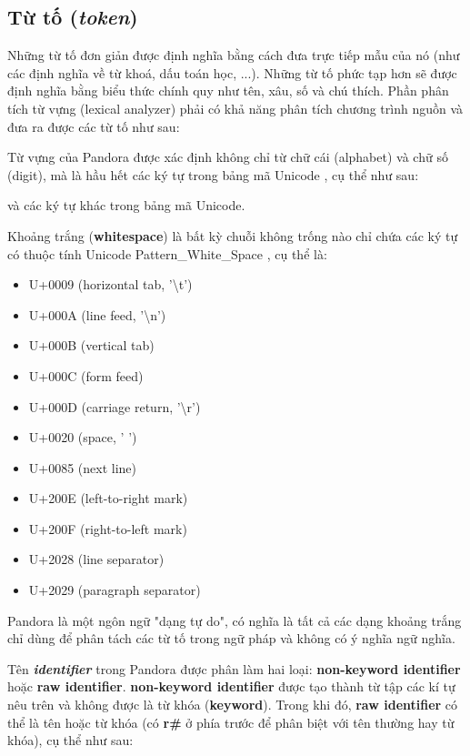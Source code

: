 \subsection{Từ tố (\textit{token})}
    Những từ tố đơn giản được định nghĩa bằng cách đưa trực tiếp mẫu của nó (như các định nghĩa về từ khoá, dấu toán học, ...). Những từ tố phức tạp hơn sẽ được định nghĩa bằng biểu thức chính quy như tên, xâu, số và chú thích. Phần phân tích từ vựng (lexical analyzer) phải có khả năng phân tích chương trình nguồn và đưa ra được các từ tố như sau:



    Từ vựng của Pandora được xác định không chỉ từ chữ cái (alphabet) và chữ số (digit), mà là hầu hết các ký tự trong bảng mã Unicode \cite{allen2012unicode}, cụ thể như sau:

    \regexdigit

    \regexalphabet

\noindent và các ký tự khác trong bảng mã Unicode.

    Khoảng trắng (\textbf{whitespace}) là bất kỳ chuỗi không trống nào chỉ chứa các ký tự có thuộc tính Unicode Pattern\_White\_Space \cite{web:unicode:report}, cụ thể là:
    \begin{itemize}
        \item{U+0009 (horizontal tab, '\textbackslash t')}
        \item{U+000A (line feed, '\textbackslash n')}
        \item{U+000B (vertical tab)}
        \item{U+000C (form feed)}
        \item{U+000D (carriage return, '\textbackslash r')}
        \item{U+0020 (space, ' ')}
        \item{U+0085 (next line)}
        \item{U+200E (left-to-right mark)}
        \item{U+200F (right-to-left mark)}
        \item{U+2028 (line separator)}
        \item{U+2029 (paragraph separator)}
    \end{itemize}
\noindent Pandora là một ngôn ngữ "dạng tự do", có nghĩa là tất cả các dạng khoảng trắng chỉ dùng để phân tách các từ tố trong ngữ pháp và không có ý nghĩa ngữ nghĩa.

    Tên \textbf{\textit{identifier}} trong Pandora được phân làm hai loại: \textbf{non-keyword identifier} hoặc \textbf{raw identifier}. \textbf{non-keyword identifier} được tạo thành từ tập các kí tự nêu trên và không được là từ khóa (\textbf{keyword}). Trong khi đó, \textbf{raw identifier} có thể là tên hoặc từ khóa (có \textbf{r\#} ở phía trước để phân biệt với tên thường hay từ khóa), cụ thể như sau:

